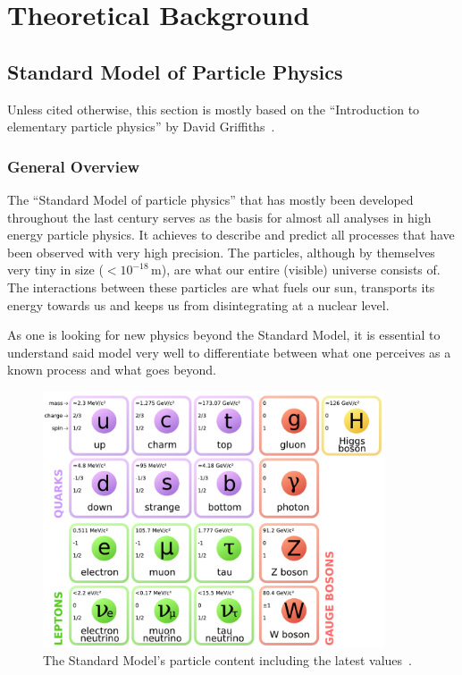 \chapter{Theoretical Background}
\pagestyle{fancy}
\section{Standard Model of Particle Physics}

Unless cited otherwise, this section is mostly based on the ``Introduction to elementary particle physics'' by David Griffiths~\cite{griffiths}.

\subsection{General Overview}
\label{sec:stdmdloverview}

The ``Standard Model of particle physics'' that has mostly been developed throughout the last century serves as the basis for almost all analyses in high energy particle physics. It achieves to describe and predict all processes that have been observed with very high precision. The particles, although by themselves very tiny in size ($< 10^{-18}\,\text{m}$), are what our entire (visible) universe consists of. The interactions between these particles are what fuels our sun, transports its energy towards us and keeps us from disintegrating at a nuclear level.


As one is looking for new physics beyond the Standard Model, it is essential to understand said model very well to differentiate between what one perceives as a known process and what goes beyond.

\begin{figure}[ht!]
  \centering
    \includegraphics[width=0.9\textwidth]{plots/Standard_Model_of_Elementary_Particles.pdf}
  \caption{The Standard Model's particle content including the latest values~\cite{stdmdlparticles,pdg}.}
  \label{fig:standardmodel}
\end{figure}

